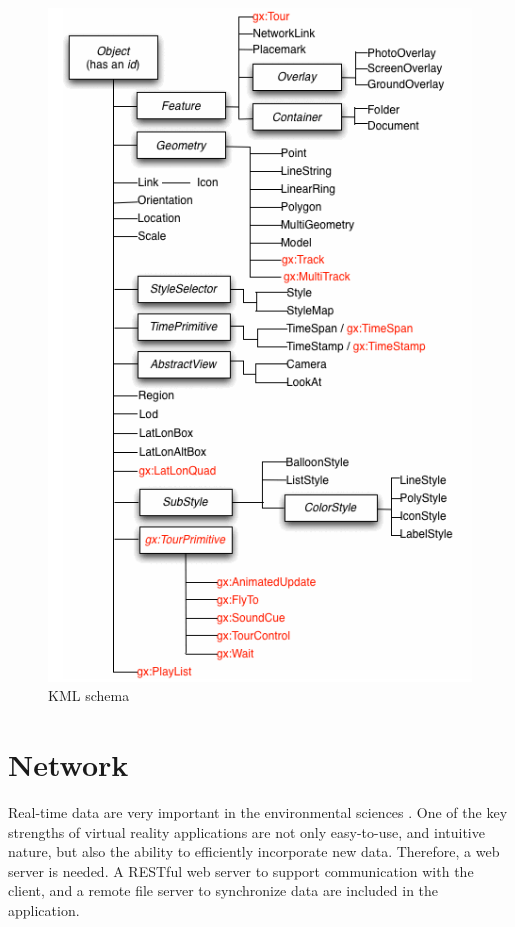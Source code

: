 \begin{figure}[H]
\caption[KML schema]{KML schema \cite{google.kml.2016}}
\label{fig:kml-schema}
\centering
\includegraphics[]{Figures/kml-schema.png}
\decoRule
\end{figure}

\section{Network}
\label{section:network}

Real-time data are very important in the environmental sciences \cite{blower.sharing-visualizing.2007}. One of the key strengths of virtual reality applications are not only easy-to-use, and intuitive nature, but also the ability to efficiently incorporate new data.  Therefore, a web server is needed. A RESTful web server to support communication with the client, and a remote file server to synchronize data are included in the application.

